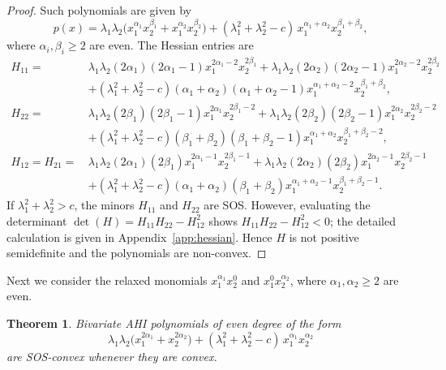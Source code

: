 \documentclass[12pt]{elsarticle}
\newtheorem{theorem}{Theorem}[section]
\theoremstyle{definition}
\begin{document}
\begin{proof}
Such polynomials are given by
\begin{equation}\label{eq:2var}
p(x) = \lambda_1\lambda_2\big(x_1^{\alpha_1}x_2^{\beta_1} + x_1^{\alpha_2}x_2^{\beta_2}\big) + (\lambda_1^2 + \lambda_2^2 - c)\,x_1^{\alpha_1 + \alpha_2}x_2^{\beta_1 + \beta_2},
\end{equation}
where $\alpha_i,\beta_i\geq 2$ are even. The Hessian entries are
\begin{equation}\label{eq:hessian-2var}
    \begin{aligned}
    H_{11} =\, & \lambda_1\lambda_2 (2\alpha_1)(2\alpha_1 -1) x_1^{2\alpha_1 - 2}x_2^{2\beta_1} +  \lambda_1\lambda_2 (2\alpha_2)(2\alpha_2 -1) x_1^{2\alpha_2 - 2}x_2^{2\beta_2}  \\
    & + (\lambda_1^2 + \lambda_2^2 - c)(\alpha_1 + \alpha_2)(\alpha_1 + \alpha_2 - 1)x_1^{\alpha_1 + \alpha_2 - 2}x_2^{\beta_1 + \beta_2},\\[2pt]
      H_{22} =\, & \lambda_1\lambda_2 (2\beta_1)(2\beta_1 -1) x_1^{2\alpha_1}x_2^{2\beta_1 - 2} +  \lambda_1\lambda_2 (2\beta_2)(2\beta_2 -1) x_1^{2\alpha_2}x_2^{2\beta_2 - 2}  \\
    & + (\lambda_1^2 + \lambda_2^2 - c)(\beta_1 + \beta_2)(\beta_1 + \beta_2 - 1)x_1^{\alpha_1 + \alpha_2}x_2^{\beta_1 + \beta_2 - 2},\\[2pt]
       H_{12}= H_{21} =\, & \lambda_1\lambda_2 (2\alpha_1)(2\beta_1)x_1^{2\alpha_1 - 1}x_2^{2\beta_1 - 1} + \lambda_1\lambda_2 (2\alpha_2)(2\beta_2)x_1^{2\alpha_2 - 1}x_2^{2\beta_2 - 1}  \\
       & + (\lambda_1^2 + \lambda_2^2 - c)(\alpha_1 + \alpha_2)(\beta_1 + \beta_2)x_1^{\alpha_1 + \alpha_2 - 1}x_2^{\beta_1 + \beta_2 - 1}.
    \end{aligned}
\end{equation}
If $\lambda_1^2 + \lambda_2^2 > c$, the minors $H_{11}$ and $H_{22}$ are SOS. However, evaluating the determinant $\det(H) = H_{11} H_{22} - H_{12}^2$ shows $H_{11} H_{22} - H_{12}^2 < 0$; the detailed calculation is given in Appendix~\ref{app:hessian}. Hence $H$ is not positive semidefinite and the polynomials are non-convex.
\end{proof}

Next we consider the relaxed monomials $x_1^{\alpha_1}x_2^0$ and $x_1^0 x_2^{\alpha_2}$, where $\alpha_1, \alpha_2 \geq 2$ are even.

\begin{theorem}\label{thm:sos-convex}
Bivariate AHI polynomials of even degree of the form
\begin{equation}\label{eq:2var-diag}
     \lambda_1\lambda_2\big(x_1^{2\alpha_1} + x_2^{2\alpha_2}\big) + (\lambda_1^2 + \lambda_2^2 - c)\,x_1^{\alpha_1}x_2^{\alpha_2}
\end{equation}
are SOS-convex whenever they are convex.
\end{theorem}
\end{document}
